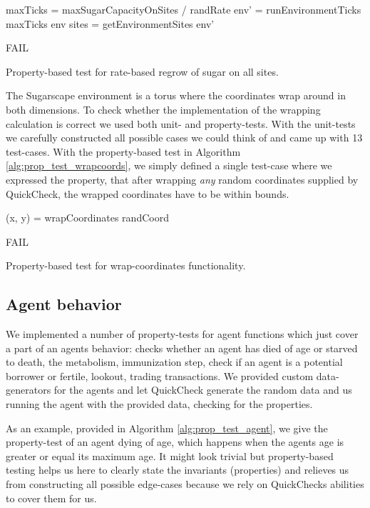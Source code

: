 \begin{algorithm}
maxTicks = maxSugarCapacityOnSites / randRate\;
env' = runEnvironmentTicks maxTicks env\;
sites = getEnvironmentSites env'\;

 {
  FAIL\;
}
\caption{Property-based test for rate-based regrow of sugar on all sites.}
\label{alg:prop_test_rateregwroth}
\end{algorithm}

The Sugarscape environment is a torus where the coordinates wrap around in both dimensions. To check whether the implementation of the wrapping calculation is correct we used both unit- and property-tests. With the unit-tests we carefully constructed all possible cases we could think of and came up with 13 test-cases. With the property-based test in Algorithm \ref{alg:prop_test_wrapcoords}, we simply defined a single test-case where we expressed the property, that after wrapping \textit{any} random coordinates supplied by QuickCheck, the wrapped coordinates have to be within bounds.

\begin{algorithm}
(x, y) = wrapCoordinates randCoord\;

 {
  FAIL\;
}
\caption{Property-based test for wrap-coordinates functionality.}
\label{alg:prop_test_wrapcoords}
\end{algorithm}

\subsection{Agent behavior}
We implemented a number of property-tests for agent functions which just cover a part of an agents behavior: checks whether an agent has died of age or starved to death, the metabolism, immunization step, check if an agent is a potential borrower or fertile, lookout, trading transactions. We provided custom data-generators for the agents and let QuickCheck generate the random data and us running the agent with the provided data, checking for the properties. 

As an example, provided in Algorithm \ref{alg:prop_test_agent}, we give the property-test of an agent dying of age, which happens when the agents age is greater or equal its maximum age. It might look trivial but property-based testing helps us here to clearly state the invariants (properties) and relieves us from constructing all possible edge-cases because we rely on QuickChecks abilities to cover them for us.

